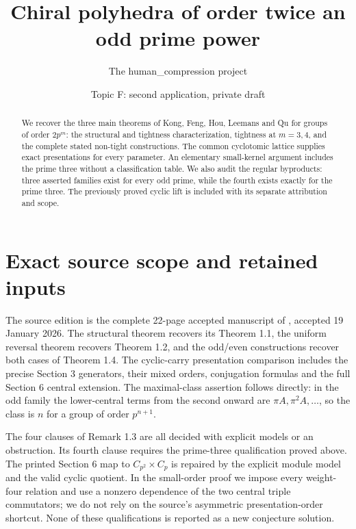 
\title{Chiral polyhedra of order twice an odd prime power}
\author{The human\_compression project}\date{Topic F: second application, private draft}
\maketitle
\begin{abstract}
We recover the three main theorems of Kong, Feng, Hou, Leemans and Qu
for groups of order $2p^m$: the structural and tightness characterization,
tightness at $m=3,4$, and the complete stated non-tight constructions.
The common cyclotomic lattice supplies exact presentations for every
parameter. An elementary small-kernel argument includes the prime
three without a classification table. We also audit the regular
byproducts: three asserted families exist for every odd prime, while
the fourth exists exactly for the prime three. The previously proved
cyclic lift is included with its separate attribution and scope.
\end{abstract}






\section{Exact source scope and retained inputs}
The source edition is the complete 22-page accepted manuscript of
\cite{KFH}, accepted 19 January 2026. The structural theorem recovers
its Theorem 1.1, the uniform reversal theorem recovers Theorem 1.2,
and the odd/even constructions recover both cases of Theorem 1.4.
The cyclic-carry presentation comparison includes the precise
Section 3 generators, their mixed orders, conjugation formulas and
the full Section 6 central extension. The maximal-class assertion
follows directly: in the odd family the lower-central terms from
the second onward are $\pi A,\pi^2A,\ldots$, so the class is $n$
for a group of order $p^{n+1}$.

The four clauses of Remark 1.3 are all decided with explicit models
or an obstruction. Its fourth clause requires the prime-three
qualification proved above. The printed Section 6 map to
$C_{p^2}\times C_p$ is repaired by the explicit module model and
the valid cyclic quotient. In the small-order proof we impose every
weight-four relation and use a nonzero dependence of the two
central triple commutators; we do not rely on the source's
asymmetric presentation-order shortcut. None of these qualifications
is reported as a new conjecture solution.

